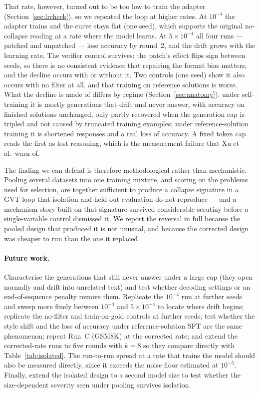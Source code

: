 \documentclass[runningheads]{llncs}
\begin{document}
That rate, however, turned out to be too low to train the adapter
(Section~\ref{sec:lrcheck}), so we repeated the loop at higher rates. At
$10^{-4}$ the adapter trains and the curve stays flat (one seed), which supports
the original no-collapse reading at a rate where the model learns. At
$5\times10^{-4}$ all four runs --- patched and unpatched --- lose accuracy by
round~2, and the drift grows with the learning rate. The verifier control
survives: the patch's effect flips sign between seeds, so there is no
consistent evidence that repairing the format bias matters, and the decline
occurs with or without it. Two controls (one seed) show it also occurs with no
filter at all, and that training on reference solutions is worse. What the
decline is made of differs by regime (Section~\ref{sec:anatomy}): under
self-training it is mostly generations that drift and never answer, with
accuracy on finished solutions unchanged, only partly recovered when the
generation cap is tripled and not caused by truncated training examples; under
reference-solution training it is shortened responses and a real loss of
accuracy. A fixed token cap reads the first as lost reasoning, which is the
measurement failure that Xu et al.\ warn of.

The finding we can defend is therefore methodological rather than
mechanistic. Pooling several datasets into one training mixture, and
scoring on the problems used for selection, are together sufficient to
produce a collapse signature in a GVT loop that isolation and held-out
evaluation do not reproduce --- and a mechanism story built on that
signature survived considerable scrutiny before a single-variable control
dismissed it. We report the reversal in full because the pooled design that
produced it is not unusual, and because the corrected design was cheaper to
run than the one it replaced.

\paragraph{Future work.}
Characterise the generations that still never answer under a large cap (they
open normally and drift into unrelated text) and test whether decoding settings
or an end-of-sequence penalty remove them. Replicate the $10^{-4}$ run at further seeds and sweep more finely between
$10^{-4}$ and $5\times10^{-4}$ to locate where drift begins; replicate the no-filter and train-on-gold controls
at further seeds; test whether the style shift and the loss of accuracy under
reference-solution SFT are the same phenomenon; repeat Run~C (GSM8K) at the
corrected rate; and extend the corrected-rate runs to five rounds with $k=8$ so
they compare directly with Table~\ref{tab:isolated}. The run-to-run spread at
a rate that trains the model should also be measured directly, since it exceeds
the noise floor estimated at $10^{-5}$. Finally, extend the isolated design to a second model size to test whether the
size-dependent severity seen under pooling survives isolation.
\end{document}
